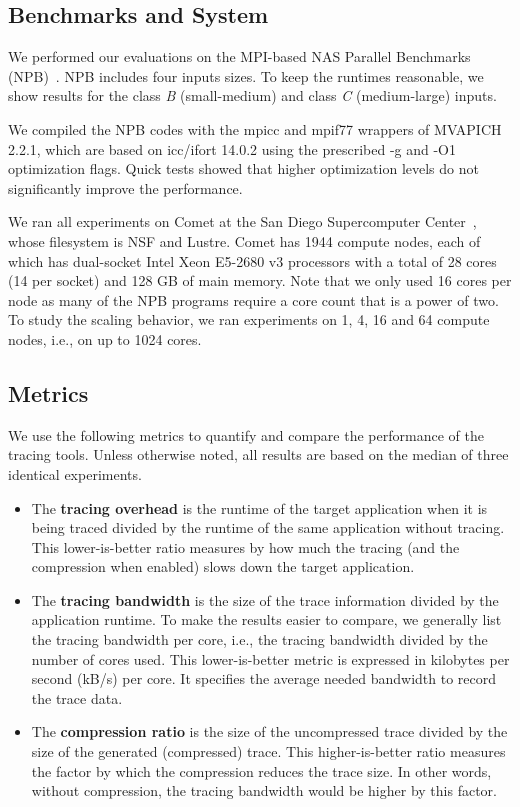 \subsection{Benchmarks and System}

We performed our evaluations on the MPI-based NAS Parallel Benchmarks (NPB)~\cite{nas}.
%
NPB includes four inputs sizes.
%
To keep the runtimes reasonable, we show results for the class \textit{B} (small-medium) and class \textit{C} (medium-large) inputs.
%

We compiled the NPB codes with the mpicc and mpif77 wrappers of MVAPICH 2.2.1, which are based on icc/ifort 14.0.2 using the prescribed -g and -O1 optimization flags.
%
Quick tests showed that higher optimization levels do not significantly improve the performance.
%

We ran all experiments on Comet at the San Diego Supercomputer Center~\cite{comet}, whose filesystem is NSF and Lustre.
%
Comet has 1944 compute nodes, each of which has dual-socket Intel Xeon E5-2680 v3 processors with a total of 28 cores (14 per socket) and 128 GB of main memory.
%
Note that we only used 16 cores per node as many of the NPB programs require a core count that is a power of two.
%
To study the scaling behavior, we ran experiments on 1, 4, 16 and 64 compute nodes, i.e., on up to 1024 cores.


\subsection{Metrics}

We use the following metrics to quantify and compare the performance of the tracing tools.
%
Unless otherwise noted, all results are based on the median of three identical experiments.
%
\begin{itemize}
\item The \textbf{tracing overhead} is the runtime of the target application when it is being traced divided by the runtime of the same application without tracing.
%
This lower-is-better ratio measures by how much the tracing (and the compression when enabled) slows down the target application.
%
\item The \textbf{tracing bandwidth} is the size of the trace information divided by the application runtime.
%
To make the results easier to compare, we generally list the tracing bandwidth per core, i.e., the tracing bandwidth divided by the number of cores used.
%
This lower-is-better metric is expressed in kilobytes per second (kB/s) per core.
%
It specifies the average needed bandwidth to record the trace data.
%
\item The \textbf{compression ratio} is the size of the uncompressed trace divided by the size of the generated (compressed) trace.
%
This higher-is-better ratio measures the factor by which the compression reduces the trace size.
%
In other words, without compression, the tracing bandwidth would be higher by this factor.
\end{itemize}


